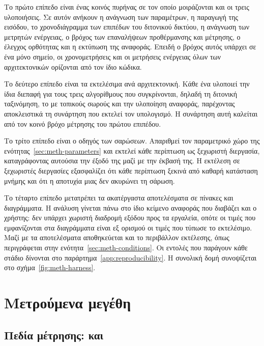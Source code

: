 Το πρώτο επίπεδο είναι ένας κοινός πυρήνας σε  τον οποίο μοιράζονται και
οι τρεις υλοποιήσεις. Σε αυτόν ανήκουν η ανάγνωση των παραμέτρων, η παραγωγή της
εισόδου, το χρονοδιάγραμμα των επιπέδων του διτονικού δικτύου, η ανάγνωση των
μετρητών ενέργειας, ο βρόχος των επαναλήψεων προθέρμανσης και μέτρησης, ο
έλεγχος ορθότητας και η εκτύπωση της αναφοράς. Επειδή ο βρόχος αυτός υπάρχει σε
ένα μόνο σημείο, οι χρονομετρήσεις και οι μετρήσεις ενέργειας όλων των
αρχιτεκτονικών ορίζονται από τον ίδιο κώδικα.

Το δεύτερο επίπεδο είναι τα εκτελέσιμα ανά αρχιτεκτονική. Κάθε ένα υλοποιεί την
ίδια διεπαφή για τους τρεις αλγορίθμους που συγκρίνονται, δηλαδή τη διτονική
ταξινόμηση, το  με τοπικούς σωρούς και την υλοποίηση αναφοράς,
παρέχοντας αποκλειστικά τη συνάρτηση που εκτελεί τον υπολογισμό. Η συνάρτηση
αυτή καλείται από τον κοινό βρόχο μέτρησης του πρώτου επιπέδου.

Το τρίτο επίπεδο είναι ο οδηγός των σαρώσεων. Απαριθμεί τον παραμετρικό χώρο της
ενότητας~\ref{sec:meth-parameters} και εκτελεί κάθε περίπτωση ως ξεχωριστή
διεργασία, καταγράφοντας αυτούσια την έξοδό της μαζί με την έκβασή της. Η
εκτέλεση σε ξεχωριστές διεργασίες εξασφαλίζει ότι κάθε περίπτωση ξεκινά από
καθαρή κατάσταση μνήμης και ότι η αποτυχία μιας δεν ακυρώνει τη σάρωση.

Το τέταρτο επίπεδο μετατρέπει τα ακατέργαστα αποτελέσματα σε πίνακες και
διαγράμματα. Η ανάλυση γίνεται πάνω στο ίδιο κείμενο αναφοράς που διαβάζει και ο
χρήστης: δεν υπάρχει χωριστή διαδρομή εξόδου προς τα εργαλεία, οπότε οι τιμές που
εμφανίζονται στα διαγράμματα είναι εξ ορισμού οι τιμές που τύπωσε το εκτελέσιμο.
Μαζί με τα αποτελέσματα αποθηκεύεται και το περιβάλλον εκτέλεσης, όπως
περιγράφεται στην ενότητα~\ref{sec:meth-conditions}. Οι εντολές που παράγουν
κάθε στάδιο δίνονται στο παράρτημα~\ref{app:reproducibility}. Η συνολική δομή
συνοψίζεται στο σχήμα~\ref{fig:meth-harness}.



\section{Μετρούμενα μεγέθη}
\label{sec:meth-quantities}

\subsection{Πεδία μέτρησης:  και }
\label{sec:meth-energy-scope}

